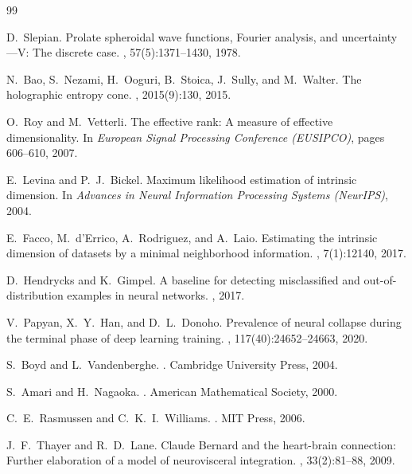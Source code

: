 \documentclass[12pt,a4paper]{article}
\begin{document}
\begin{thebibliography}{99}

D.~Slepian.
\newblock Prolate spheroidal wave functions, Fourier analysis, and uncertainty---V: The discrete case.
, 57(5):1371--1430, 1978.

N.~Bao, S.~Nezami, H.~Ooguri, B.~Stoica, J.~Sully, and M.~Walter.
\newblock The holographic entropy cone.
, 2015(9):130, 2015.

O.~Roy and M.~Vetterli.
\newblock The effective rank: A measure of effective dimensionality.
\newblock In {\em European Signal Processing Conference (EUSIPCO)}, pages 606--610, 2007.

E.~Levina and P.~J.~Bickel.
\newblock Maximum likelihood estimation of intrinsic dimension.
\newblock In {\em Advances in Neural Information Processing Systems (NeurIPS)}, 2004.

E.~Facco, M.~d'Errico, A.~Rodriguez, and A.~Laio.
\newblock Estimating the intrinsic dimension of datasets by a minimal neighborhood information.
, 7(1):12140, 2017.

D.~Hendrycks and K.~Gimpel.
\newblock A baseline for detecting misclassified and out-of-distribution examples in neural networks.
, 2017.

V.~Papyan, X.~Y.~Han, and D.~L.~Donoho.
\newblock Prevalence of neural collapse during the terminal phase of deep learning training.
, 117(40):24652--24663, 2020.

S.~Boyd and L.~Vandenberghe.
.
\newblock Cambridge University Press, 2004.

S.~Amari and H.~Nagaoka.
.
\newblock American Mathematical Society, 2000.

C.~E.~Rasmussen and C.~K.~I.~Williams.
.
\newblock MIT Press, 2006.

J.~F.~Thayer and R.~D.~Lane.
\newblock Claude Bernard and the heart-brain connection: Further elaboration of a model of neurovisceral integration.
, 33(2):81--88, 2009.


\end{thebibliography}
\end{document}
